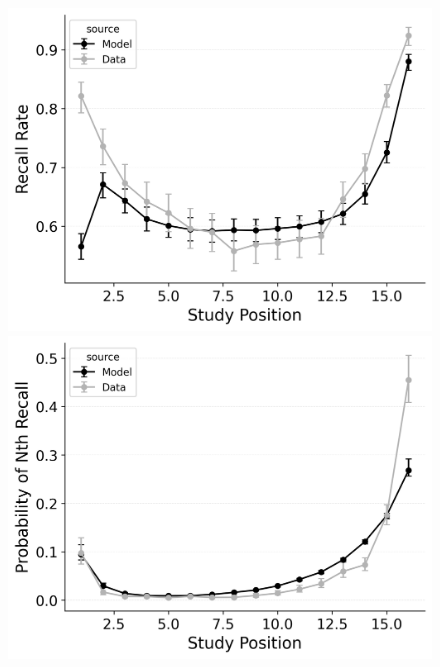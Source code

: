 \documentclass[
  man,
  floatsintext,
  longtable,
  nolmodern,
  notxfonts,
  notimes,
  draftfirst,
  colorlinks=true,linkcolor=blue,citecolor=blue,urlcolor=blue]{apa7}
\begin{document}
\begin{figure}
\begin{minipage}{0.33\linewidth}
\includegraphics{figures/bw_HealeyKahana2014_CRU_with_Pre-Expt__Primacy__and_StartDrift_Fitting_spc.png}\end{minipage}%
\newline
\begin{minipage}{0.33\linewidth}
\includegraphics{figures/bw_HealeyKahana2014_CRU_with_Feature-to-Context__Primacy__and_StartDrift_Fitting_pnr.png}\end{minipage}%
%
\begin{minipage}{0.33\linewidth}

\end{minipage}
\end{figure}
\end{document}
